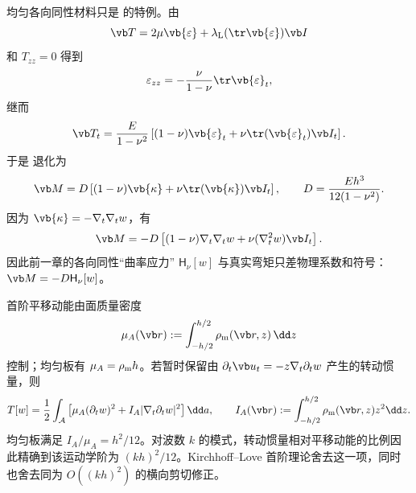 均匀各向同性材料只是 的特例。由
\[
 \vb T=2\mu\vb{\varepsilon}+\lambda_{\rm L}(\tr\vb{\varepsilon})\vb I
\]
和 \(T_{zz}=0\) 得到
\[
 \varepsilon_{zz}
 =-\frac{\nu}{1-\nu}\tr\vb{\varepsilon}_t,
\]
继而
\[
 \vb T_t
 =\frac{E}{1-\nu^2}
 \left[(1-\nu)\vb{\varepsilon}_t
 +\nu\tr(\vb{\varepsilon}_t)\vb I_t\right].
\]
于是 退化为
\begin{equation}
 \vb M
 =D\left[(1-\nu)\vb{\kappa}+\nu\tr(\vb{\kappa})\vb I_t\right],
 \qquad
 D=\frac{Eh^3}{12(1-\nu^2)}.
 \label{eq:phys-cont-kl-moment}
\end{equation}
因为 \(\vb{\kappa}=-\nabla_t\nabla_t w\)，有
\[
 \vb M=-D\left[(1-\nu)\nabla_t\nabla_t w
 +\nu(\nabla_t^2w)\vb I_t\right].
\]
因此前一章的各向同性“曲率应力” \(\mathsf H_\nu[w]\) 与真实弯矩只差物理系数和符号：\(\vb M=-D\mathsf H_\nu[w]\)。

首阶平移动能由面质量密度
\[
 \mu_A(\vb r):=\int_{-h/2}^{h/2}\rho_{\rm m}(\vb r,z)\,\dd z
\]
控制；均匀板有 \(\mu_A=\rho_{\rm m} h\)。若暂时保留由 \(\partial_t\vb u_t=-z\nabla_t\partial_t w\) 产生的转动惯量，则
\begin{equation}
 T[w]
 =\frac12\int_{\mathcal A}
 \left[\mu_A(\partial_tw)^2+I_A|\nabla_t\partial_tw|^2\right]\dd a,
 \qquad
 I_A(\vb r):=\int_{-h/2}^{h/2}\rho_{\rm m}(\vb r,z)z^2\dd z.
 \label{eq:phys-cont-kl-kinetic}
\end{equation}
均匀板满足 \(I_A/\mu_A=h^2/12\)。对波数 \(k\) 的模式，转动惯量相对平移动能的比例因此精确到该运动学阶为 \((kh)^2/12\)。Kirchhoff--Love 首阶理论舍去这一项，同时也舍去同为 \(O((kh)^2)\) 的横向剪切修正。



